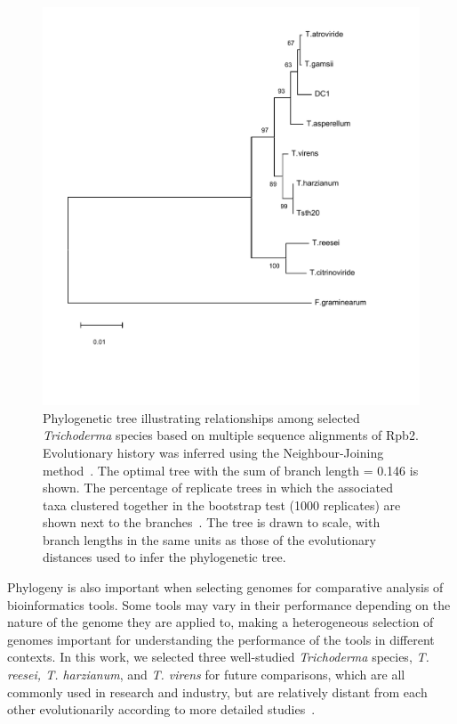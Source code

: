 \begin{figure}
    \centering
    \includegraphics[width=\textwidth]{figures/trichoderma-phylogeny-few-outgroups.pdf}
    \caption{Phylogenetic tree illustrating relationships among selected \textit{Trichoderma} species based on multiple sequence alignments of Rpb2. Evolutionary history was inferred using the Neighbour-Joining method~\cite{Saitou1987}. The optimal tree with the sum of branch length = 0.146 is shown. The percentage of replicate trees in which the associated taxa clustered together in the bootstrap test (1000 replicates) are shown next to the branches~\cite{Felsenstein1985}. The tree is drawn to scale, with branch lengths in the same units as those of the evolutionary distances used to infer the phylogenetic tree.}
    \label{fig:phylogeny}
\end{figure}

Phylogeny is also important when selecting genomes for comparative analysis of bioinformatics tools. Some tools may vary in their performance depending on the nature of the genome they are applied to, making a heterogeneous selection of genomes important for understanding the performance of the tools in different contexts. In this work, we selected three well-studied \textit{Trichoderma} species, \textit{T. reesei, T. harzianum}, and \textit{T. virens} for future comparisons, which are all commonly used in research and industry, but are relatively distant from each other evolutionarily according to more detailed studies~\cite{an2022}. 

